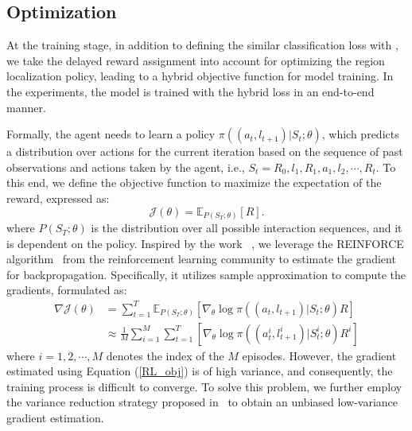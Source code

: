 \documentclass[letterpaper]{article} %
\begin{document}
\subsection{Optimization}
At the training stage, in addition to defining the similar classification loss with \cite{yang2016exploit}, we take the delayed reward assignment into account for optimizing the region localization policy, leading to a hybrid objective function for model training. In the experiments, the model is trained with the hybrid loss in an end-to-end manner.

Formally, the agent needs to learn a policy $\pi((a_t,l_{t+1})|S_t;\theta)$, which predicts a distribution over actions for the current iteration based on the sequence of past observations and actions taken by the agent, i.e.,  $S_t=R_0,l_1,R_1,a_1,l_2,\cdots,R_t$. To this end, we define the objective function to maximize the expectation of the reward, expressed as:
\begin{equation}
      \mathcal{J}(\theta)=\mathbb{E}_{P(S_T;\theta)}[R].
\end{equation}
where $P(S_T;\theta)$ is the distribution over all possible interaction sequences, and it is dependent on the policy. Inspired by the work ~\cite{mnih2014recurrent}, we leverage the REINFORCE algorithm~\cite{williams1992simple} from the reinforcement learning community to estimate the gradient for backpropagation. Specifically, it utilizes sample approximation to compute the gradients, formulated as:
\begin{equation}
   \begin{split}
      \nabla{\mathcal{J}(\theta)}&=\sum_{t=1}^T\mathbb{E}_{P(S_T;\theta)}[\nabla_{\theta}\log{\pi((a_t,l_{t+1})|S_t;\theta)}R]\\
      &\approx \frac{1}{M}\sum_{i=1}^M\sum_{t=1}^T [\nabla_{\theta}\log{\pi((a_t^i,l_{t+1}^i)|S^i_t;\theta)}R^i]
         \end{split}
         \label{RL_obj}
\end{equation}
where $i=1,2,\cdots,M$ denotes the index of the $M$ episodes. However, the gradient estimated using Equation (\ref{RL_obj}) is of high variance, and consequently, the training process is difficult to converge. To solve this problem, we further employ the variance reduction strategy proposed in~\cite{mnih2014recurrent} to obtain an unbiased low-variance gradient estimation.
\end{document}

